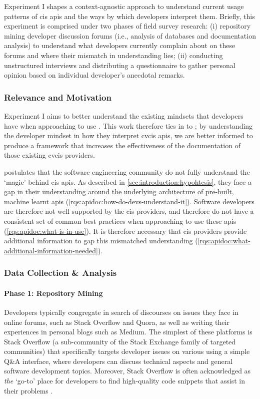 Experiment I shapes a context-agnostic approach to understand current usage patterns of \gls{cis} \glspl{api} and the ways by which developers interpret them. Briefly, this experiment is comprised under two phases of field survey research: (i) repository mining developer discussion forums (i.e., analysis of databases and documentation analysis) to understand what developers currently complain about on these forums and where their mismatch in understanding lies; (ii) conducting unstructured interviews and distributing a questionnaire to gather personal opinion based on individual developer's anecdotal remarks.

\subsubsection{Relevance and Motivation}

Experiment I aims to better understand the existing mindsets that developers have when approaching to use . This work therefore ties in to ; by understanding the developer mindset in how they interpret \gls{cvcis} \glspl{api}, we are better informed to produce a framework that increases the effectiveness of the documentation of those existing \gls{cvcis} providers.

 postulates that the software engineering community do not fully understand the `magic' behind \gls{cis} \glspl{api}. As described in \cref{sec:introduction:hypohtesis}, they face a gap in their understanding around the underlying architecture of pre-built, machine learnt \glspl{api} (\ref{rqs:apidoc:how-do-devs-understand-it}). Software developers are therefore not well supported by the \gls{cis} providers, and therefore do not have a consistent set of common best practices when approaching to use these \glspl{api} (\ref{rqs:apidoc:what-is-in-use}). It is therefore necessary that \gls{cis} providers provide additional information to gap this mismatched understanding (\ref{rqs:apidoc:what-additional-information-needed}). 

\subsubsection{Data Collection \& Analysis}

\paragraph{Phase 1: Repository Mining}
Developers typically congregate in search of discourses on issues they face in online forums, such as Stack Overflow and Quora, as well as writing their experiences in personal blogs such as Medium. The simplest of these platforms is Stack Overflow (a sub-community of the Stack Exchange family of targeted communities) that specifically targets developer issues on various using a simple Q\&A interface, where developers can discuss technical aspects and general software development topics. Moreover, Stack Overflow is often acknowledged as \textit{the} `go-to' place for developers to find high-quality code snippets that assist in their problems \citep{Subramanian:2014bg}.

